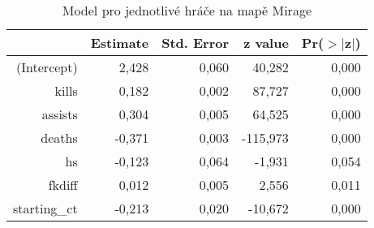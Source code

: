 \begin{table}[H]
\centering
\begin{tabular}{rrrrr}
  \hline
 & Estimate & Std. Error & z value & Pr($>$$|$z$|$) \\ 
  \hline
(Intercept) & 2,428 & 0,060 & 40,282 & 0,000 \\ 
  kills & 0,182 & 0,002 & 87,727 & 0,000 \\ 
  assists & 0,304 & 0,005 & 64,525 & 0,000 \\ 
  deaths & -0,371 & 0,003 & -115,973 & 0,000 \\ 
  hs & -0,123 & 0,064 & -1,931 & 0,054 \\ 
  fkdiff & 0,012 & 0,005 & 2,556 & 0,011 \\ 
  starting\_ct & -0,213 & 0,020 & -10,672 & 0,000 \\ 
   \hline
\end{tabular}
\caption{\label{tab:player_model_Mirage}Model pro jednotlivé hráče na mapě Mirage} 
\end{table}

